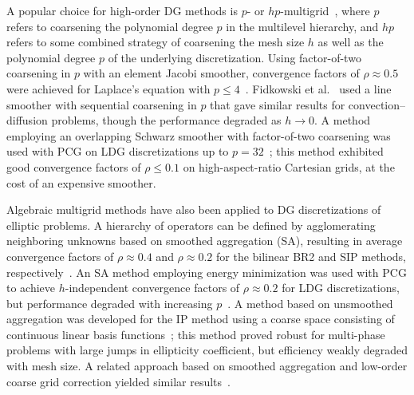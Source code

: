 A popular choice for high-order DG methods is $p$- or $hp$-multigrid~\cite{Helenbrook_03_01, Fidkowski_05_01, Luo_06_01, Bassi_08_01}, where $p$ refers to coarsening the polynomial degree $p$ in the multilevel hierarchy, and $hp$ refers to some combined strategy of coarsening the mesh size $h$ as well as the polynomial degree $p$ of the underlying discretization. Using factor-of-two coarsening in $p$ with an element Jacobi smoother, convergence factors of $\rho \approx 0.5$ were achieved for Laplace's equation with $p \leq 4$~\cite{Helenbrook_03_01}. Fidkowski et al.~\cite{Fidkowski_05_01} used a line smoother with sequential coarsening in $p$ that gave similar results for convection--diffusion problems, though the performance degraded as $h \to 0$. A method employing an overlapping Schwarz smoother with factor-of-two coarsening was used with PCG on LDG discretizations up to $p=32$~\cite{Stiller_16_01}; this method exhibited good convergence factors of $\rho \leq 0.1$ on high-aspect-ratio Cartesian grids, at the cost of an expensive smoother.

Algebraic multigrid methods have also been applied to DG discretizations of elliptic problems. A hierarchy of operators can be defined by agglomerating neighboring unknowns based on smoothed aggregation (SA), resulting in average convergence factors of $\rho \approx 0.4$ and $\rho \approx 0.2$ for the bilinear BR2 and SIP methods, respectively~\cite{Prill_09_01}. An SA method employing energy minimization was used with PCG to achieve $h$-independent convergence factors of $\rho \approx 0.2$ for LDG discretizations, but performance degraded with increasing $p$~\cite{Olson_11_01}. A method based on unsmoothed aggregation was developed for the IP method using a coarse space consisting of continuous linear basis functions~\cite{Bastian_12_01}; this method proved robust for multi-phase problems with large jumps in ellipticity coefficient, but efficiency weakly degraded with mesh size. A related approach based on smoothed aggregation and low-order coarse grid correction yielded similar results~\cite{Siefert_14_01}.

